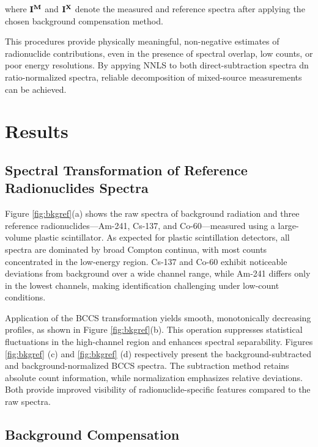 \documentclass[10pt]{wlscirep}
\begin{document}
where $\bf{I}^M$ and $\bf{I}^{X}$ denote the measured and reference spectra after applying the chosen background compensation method.

This procedures provide physically meaningful, non-negative estimates of radionuclide contributions, even in the presence of spectral overlap, low counts, or poor energy resolutions. By appying NNLS to both direct-subtraction spectra dn ratio-normalized spectra, reliable decomposition of mixed-source measurements can be achieved.

\section*{Results}


\subsection*{Spectral Transformation of Reference Radionuclides Spectra}

Figure \ref{fig:bkgref}(a) shows the raw spectra of background radiation and three reference radionuclides—Am-241, Cs-137, and Co-60—measured using a large-volume plastic scintillator. As expected for plastic scintillation detectors, all spectra are dominated by broad Compton continua, with most counts concentrated in the low-energy region. Cs-137 and Co-60 exhibit noticeable deviations from background over a wide channel range, while Am-241 differs only in the lowest channels, making identification challenging under low-count conditions.

Application of the BCCS transformation yields smooth, monotonically decreasing profiles, as shown in Figure \ref{fig:bkgref}(b). This operation suppresses statistical fluctuations in the high-channel region and enhances spectral separability. Figures \ref{fig:bkgref} (c) and \ref{fig:bkgref} (d) respectively present the background-subtracted and background-normalized BCCS spectra. The subtraction method retains absolute count information, while normalization emphasizes relative deviations. Both provide improved visibility of radionuclide-specific features compared to the raw spectra.


\subsection*{Background Compensation }
\end{document}
